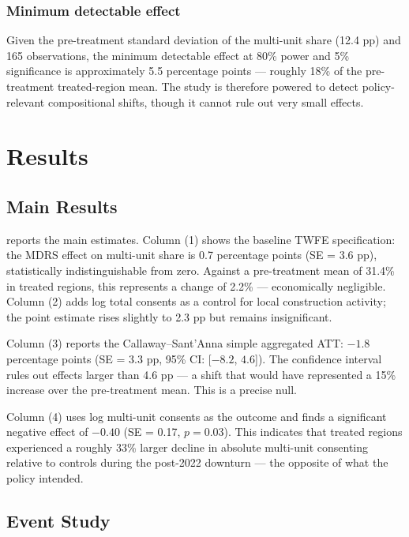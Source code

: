 \documentclass[12pt]{article}
\begin{document}
\subsubsection*{Minimum detectable effect} Given the pre-treatment standard deviation of the multi-unit share (12.4 pp) and 165 observations, the minimum detectable effect at 80\% power and 5\% significance is approximately 5.5 percentage points --- roughly 18\% of the pre-treatment treated-region mean. The study is therefore powered to detect policy-relevant compositional shifts, though it cannot rule out very small effects.


\section{Results}
\label{sec:results}

\subsection{Main Results}



 reports the main estimates. Column (1) shows the baseline TWFE specification: the MDRS effect on multi-unit share is 0.7 percentage points (SE = 3.6 pp), statistically indistinguishable from zero. Against a pre-treatment mean of 31.4\% in treated regions, this represents a change of 2.2\% --- economically negligible. Column (2) adds log total consents as a control for local construction activity; the point estimate rises slightly to 2.3 pp but remains insignificant.

Column (3) reports the Callaway--Sant'Anna simple aggregated ATT: $-1.8$ percentage points (SE = 3.3 pp, 95\% CI: [$-8.2$, $4.6$]). The confidence interval rules out effects larger than 4.6 pp --- a shift that would have represented a 15\% increase over the pre-treatment mean. This is a precise null.

Column (4) uses log multi-unit consents as the outcome and finds a significant negative effect of $-0.40$ (SE = 0.17, $p = 0.03$). This indicates that treated regions experienced a roughly 33\% larger decline in absolute multi-unit consenting relative to controls during the post-2022 downturn --- the opposite of what the policy intended.

\subsection{Event Study}
\end{document}
